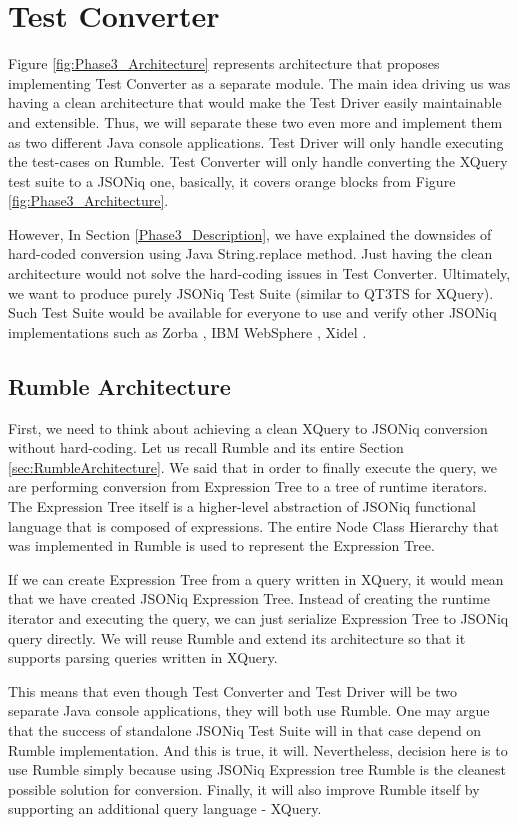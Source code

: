 
\chapter{Test Converter}
Figure \ref{fig:Phase3_Architecture} represents architecture that proposes implementing Test Converter as a separate module. The main idea driving us was having a clean architecture that would make the Test Driver easily maintainable and extensible. Thus, we will separate these two even more and implement them as two different Java console applications. Test Driver will only handle executing the test-cases on Rumble. Test Converter will only handle converting the XQuery test suite to a JSONiq one, basically, it covers orange blocks from Figure \ref{fig:Phase3_Architecture}. 

However, In Section \ref{Phase3_Description}, we have explained the downsides of hard-coded conversion using Java String.replace method. Just having the clean architecture would not solve the hard-coding issues in Test Converter. Ultimately, we want to produce purely JSONiq Test Suite (similar to QT3TS for XQuery). Such Test Suite would be available for everyone to use and verify other JSONiq implementations such as Zorba \cite{Zorba}, IBM WebSphere \cite{WebSphere}, Xidel \cite{Xidel}.

\section{Rumble Architecture}
First, we need to think about achieving a clean XQuery to JSONiq conversion without hard-coding. Let us recall Rumble and its entire Section \ref{sec:RumbleArchitecture}. We said that in order to finally execute the query, we are performing conversion from Expression Tree to a tree of runtime iterators. The Expression Tree itself is a higher-level abstraction of JSONiq functional language that is composed of expressions. The entire Node Class Hierarchy that was implemented in Rumble is used to represent the Expression Tree.

If we can create Expression Tree from a query written in XQuery, it would mean that we have created JSONiq Expression Tree. Instead of creating the runtime iterator and executing the query, we can just serialize Expression Tree to JSONiq query directly. We will reuse Rumble and extend its architecture so that it supports parsing queries written in XQuery. 

This means that even though Test Converter and Test Driver will be two separate Java console applications, they will both use Rumble. One may argue that the success of standalone JSONiq Test Suite will in that case depend on Rumble implementation. And this is true, it will. Nevertheless, decision here is to use Rumble simply because using JSONiq Expression tree Rumble is the cleanest possible solution for conversion. Finally, it will also improve Rumble itself by supporting an additional query language - XQuery.

